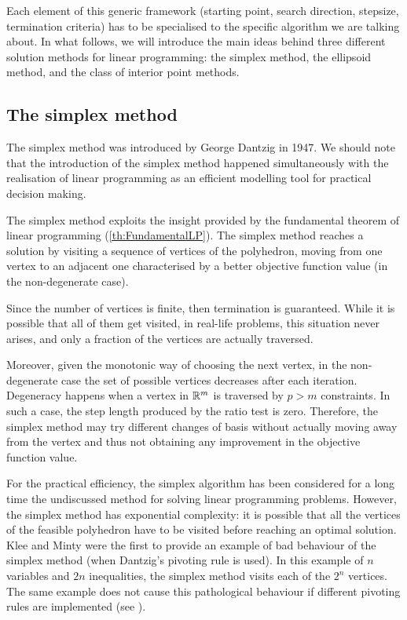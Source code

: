 Each element of this generic framework
(starting point, search direction, stepsize, termination criteria)
has to be specialised
to the specific algorithm we are talking about.
In what follows, we will introduce the main ideas behind three 
different solution methods for linear programming: the simplex method,
the ellipsoid method, and the class of interior point methods.

%
%
\subsection{The simplex method}

The simplex method was introduced by George Dantzig in 1947.
We should note that the
introduction of the simplex method happened simultaneously with
the realisation of linear programming as an efficient modelling tool
for practical decision making. 

The simplex method exploits the insight provided by the fundamental 
theorem of linear programming (\ref{th:FundamentalLP}).
The simplex method reaches a solution by visiting a sequence of 
vertices of the polyhedron, moving from one vertex to an adjacent 
one characterised by a better objective function value
(in the non-degenerate case). 

Since the number of vertices is finite, then termination is guaranteed.
While it is possible that all of them get visited, in real-life problems, 
this situation never arises, and only a fraction of the vertices are
actually traversed.

Moreover, given the monotonic
way of choosing the next vertex, in the non-degenerate case the set 
of possible vertices decreases after each iteration. Degeneracy
happens when a vertex in $\mathbb{R}^m$ is traversed by $p > m$ constraints.
In such a case, the step length produced by the ratio test
is zero. Therefore, the simplex method
may try different changes of basis without actually moving away
from the vertex and thus not obtaining any improvement in the objective
function value.


For the practical efficiency, the simplex algorithm has been considered
for a long time the undiscussed method for solving linear programming
problems.
However, the simplex method has exponential complexity: it is possible that all
the vertices of the feasible polyhedron have to be visited
before reaching an optimal solution.
Klee and Minty \cite{KleeMinty} were the first to provide an example 
of bad behaviour of the simplex method (when Dantzig's pivoting rule 
is used). In this example of $n$ variables and $2n$ inequalities,
the simplex method visits each of the $2^n$ vertices.
The same example does not cause this pathological behaviour if different
pivoting rules are implemented (see \cite[ch.~4]{lp:Chvatal}).

